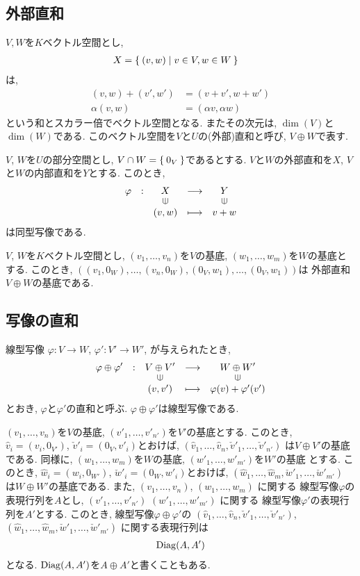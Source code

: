 \subsection{外部直和}


$V,W$を$K$ベクトル空間とし,
\begin{align*}
  X&=\Set{(v,w)|v\in V,w\in W}
\end{align*}
は,
\begin{align*}
  (v,w)+(v',w')&=(v+v',w+w')\\
  \alpha(v,w)&=(\alpha v,\alpha w)
\end{align*}
という和とスカラー倍でベクトル空間となる.
またその次元は, $\dim(V)$と$\dim(W)$である.
このベクトル空間を$V$と$U$の(外部)直和と呼び,
$V\oplus W$で表す.

\begin{prop}
  $V$, $W$を$U$の部分空間とし,
  $V\cap W=\Set{0_V}$であるとする.
  $V$と$W$の外部直和を$X$,
  $V$と$W$の内部直和を$Y$とする.
  このとき,
  \begin{align*}
    \shazo{\varphi}
          {X}{Y}
          {(v,w)}{v+w}
  \end{align*}
  は同型写像である.
\end{prop}

\begin{prop}
  $V$, $W$を$K$ベクトル空間とし,
  $(v_1,\ldots,v_n)$を$V$の基底,
  $(w_1,\ldots,w_m)$を$W$の基底とする.
  このとき,
  $((v_1,0_W),\ldots,(v_n,0_W),(0_V,w_1),\ldots,(0_V,w_1))$は
  外部直和$V\oplus W$の基底である.
\end{prop}


\subsection{写像の直和}
線型写像
$\varphi\colon V\to W$,
$\varphi'\colon V'\to W'$,
が与えられたとき,
\begin{align*}
  \shazo{\varphi\oplus\varphi'}
        {V\oplus V'}{W\oplus W'}
        {(v,v')}{\varphi(v)+\varphi'(v')}
\end{align*}
とおき, $\varphi$と$\varphi'$の直和と呼ぶ.
$\varphi\oplus\varphi'$は線型写像である.


$(v_1,\ldots,v_n)$を$V$の基底,
$(v'_1,\ldots,v'_{n'})$を$V'$の基底とする.
このとき,
$\hat v_i=(v_i,0_{V'})$,
$\check v'_i=(0_V,v'_i)$とおけば,
$(\hat v_1,\ldots,\hat v_n,\check v'_1,\ldots, \check v'_{n'})$
は$V\oplus V'$の基底である.
同様に,
$(w_1,\ldots,w_m)$を$W$の基底,
$(w'_1,\ldots,w'_{m'})$を$W'$の基底
とする.
このとき,
$\hat w_i=(w_i,0_{W'})$,
$\check w'_i=(0_W,w'_i)$とおけば,
$(\hat w_1,\ldots,\hat w_m,\check w'_1,\ldots, \check w'_{m'})$
は$W\oplus W'$の基底である.
また,
$(v_1,\ldots,v_n)$,
$(w_1,\ldots,w_m)$
に関する
線型写像$\varphi$の表現行列を$A$とし,
$(v'_1,\ldots,v'_{n'})$
$(w'_1,\ldots,w'_{m'})$
に関する
線型写像$\varphi'$の表現行列を$A'$とする.
このとき,
線型写像$\varphi\oplus\varphi'$の
$(\hat v_1,\ldots,\hat v_n,\check v'_1,\ldots, \check v'_{n'})$,
$(\hat w_1,\ldots,\hat w_m,\check w'_1,\ldots, \check w'_{m'})$
に関する表現行列は
\begin{align*}
  \operatorname{Diag}(A,A')
\end{align*}
となる.
$\operatorname{Diag}(A,A')$を$A\oplus A'$と書くこともある.

